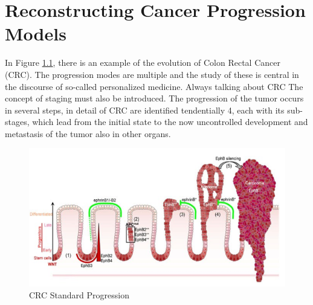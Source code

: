 \chapter{Reconstructing Cancer Progression Models}
In Figure \ref{fig:CRC}, there is an example of the evolution of Colon Rectal Cancer (CRC). 
The progression modes are multiple and the study of these is central in the discourse 
of so-called personalized medicine. Always talking about CRC The concept of staging 
must also be introduced. The progression of the tumor occurs in several steps, in 
detail of CRC are identified tendentially 4, each with its sub-stages, which lead from 
the initial state to the now uncontrolled development and metastasis of the tumor also 
in other organs.

\begin{figure}[!ht]
    \centering
    \includegraphics[width=0.5\linewidth]{img/CancerProgression/CRC.png}
    \caption{CRC Standard Progression}
    \label{fig:CRC}
\end{figure}

